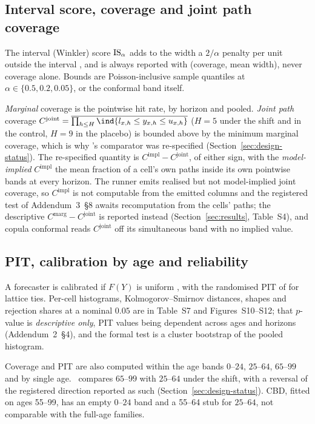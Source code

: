 \subsection{Interval score, coverage and joint path coverage}
\label{sec:metrics-interval}
\label{sec:metrics-coverage}

The interval (Winkler) score $\operatorname{IS}_\alpha$ adds to the width a $2/\alpha$
penalty per unit outside the interval
\citep{winkler1972decision,gneiting2007strictly}, and is always reported with
(coverage, mean width), never coverage alone. Bounds are
Poisson-inclusive sample quantiles at $\alpha\in\{0.5,0.2,0.05\}$, or the
conformal band itself.

\emph{Marginal} coverage is the pointwise hit rate, by horizon and pooled.
\emph{Joint path} coverage
$C^{\mathrm{joint}}=\overline{\prod_{h\le H}\ind\{l_{x,h}\le y_{x,h}\le
u_{x,h}\}}$ ($H=5$ under the shift and in the control, $H=9$ in the placebo)
is bounded above by the minimum marginal coverage, which is why \Hthree's
comparator was re-specified (Section~\ref{sec:design-status}). The
re-specified quantity is $C^{\mathrm{impl}}-C^{\mathrm{joint}}$, of either
sign, with the \emph{model-implied} $C^{\mathrm{impl}}$ the mean fraction of a
cell's own paths inside its own pointwise bands at every horizon. The runner
emits realised but not model-implied joint coverage, so $C^{\mathrm{impl}}$ is
not computable from the emitted columns and the registered test of
Addendum~3~\S8 awaits recomputation from the cells' paths; the
descriptive $C^{\mathrm{marg}}-C^{\mathrm{joint}}$ is reported instead
(Section~\ref{sec:results}, Table~S4), and copula conformal reads
$C^{\mathrm{joint}}$ off its simultaneous band with no implied value.

\subsection{PIT, calibration by age and reliability}

A forecaster is calibrated if $F(Y)$ is uniform
\citep{gneiting2007probabilistic,dawid1984present}, with the randomised PIT of
\citet{czado2009predictive} for lattice ties. Per-cell histograms,
Kolmogorov--Smirnov distances, shapes and rejection shares at a nominal $0.05$
are in Table~S7 and Figures~S10--S12; that $p$-value is \emph{descriptive
only}, PIT values being dependent across ages and horizons (Addendum~2~\S4),
and the formal test is a cluster bootstrap of the pooled histogram.

Coverage and PIT are also computed within the age bands $0$--$24$, $25$--$64$,
$65$--$99$ and by single age. \Hfour\ compares $65$--$99$ with
$25$--$64$ under the shift, with a reversal of the registered direction
reported as such (Section~\ref{sec:design-status}). CBD, fitted on ages
55--99, has an empty $0$--$24$ band and a 55--64 stub for $25$--$64$, not
comparable with the full-age families.

